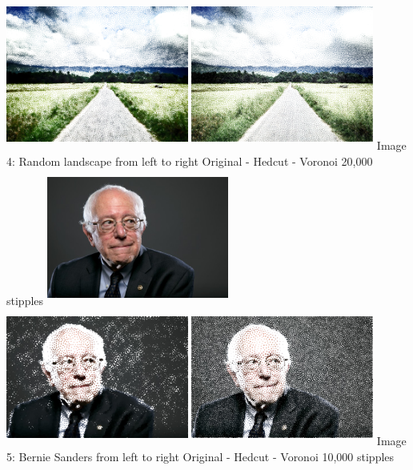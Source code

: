 \documentclass[11pt]{article}
\begin{document}
\includegraphics[width=6cm, height=5cm]{landscape-hedcut-20000.png}
\includegraphics[width=6cm, height=5cm]{landscape-voronoi-20000.png}
\newline Image 4: Random landscape from left to right Original - Hedcut - Voronoi 20,000 stipples
\newline 
\newline\includegraphics[width=6cm, height=4.5cm]{sanders.png} 
\includegraphics[width=6cm, height=4.5cm]{sanders-hedcut-10000.png}
\includegraphics[width=6cm, height=4.5cm]{sanders_voronoi_10000.png}
\newline Image 5: Bernie Sanders from left to right Original - Hedcut - Voronoi 10,000 stipples
\end{document}
